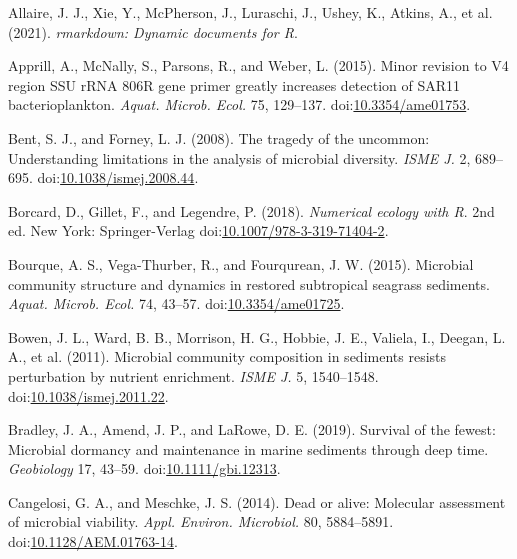 \documentclass[12pt,]{article}
\begin{document}
 \setlength{\emergencystretch}{8.5em}

\hypertarget{refs}{}
\leavevmode\hypertarget{ref-Allaire2021}{}%
Allaire, J. J., Xie, Y., McPherson, J., Luraschi, J., Ushey, K., Atkins,
A., et al. (2021). \emph{rmarkdown: Dynamic documents for R}.

\leavevmode\hypertarget{ref-Apprill2015a}{}%
Apprill, A., McNally, S., Parsons, R., and Weber, L. (2015). Minor
revision to V4 region SSU rRNA 806R gene primer greatly increases
detection of SAR11 bacterioplankton. \emph{Aquat. Microb. Ecol.} 75,
129--137. doi:\href{https://doi.org/10.3354/ame01753}{10.3354/ame01753}.

\leavevmode\hypertarget{ref-Bent2008}{}%
Bent, S. J., and Forney, L. J. (2008). The tragedy of the uncommon:
Understanding limitations in the analysis of microbial diversity.
\emph{ISME J.} 2, 689--695.
doi:\href{https://doi.org/10.1038/ismej.2008.44}{10.1038/ismej.2008.44}.

\leavevmode\hypertarget{ref-Borcard2018}{}%
Borcard, D., Gillet, F., and Legendre, P. (2018). \emph{Numerical
ecology with R}. 2nd ed. New York: Springer-Verlag
doi:\href{https://doi.org/10.1007/978-3-319-71404-2}{10.1007/978-3-319-71404-2}.

\leavevmode\hypertarget{ref-Bourque2015}{}%
Bourque, A. S., Vega-Thurber, R., and Fourqurean, J. W. (2015).
Microbial community structure and dynamics in restored subtropical
seagrass sediments. \emph{Aquat. Microb. Ecol.} 74, 43--57.
doi:\href{https://doi.org/10.3354/ame01725}{10.3354/ame01725}.

\leavevmode\hypertarget{ref-Bowen2011a}{}%
Bowen, J. L., Ward, B. B., Morrison, H. G., Hobbie, J. E., Valiela, I.,
Deegan, L. A., et al. (2011). Microbial community composition in
sediments resists perturbation by nutrient enrichment. \emph{ISME J.} 5,
1540--1548.
doi:\href{https://doi.org/10.1038/ismej.2011.22}{10.1038/ismej.2011.22}.

\leavevmode\hypertarget{ref-Bradley2019}{}%
Bradley, J. A., Amend, J. P., and LaRowe, D. E. (2019). Survival of the
fewest: Microbial dormancy and maintenance in marine sediments through
deep time. \emph{Geobiology} 17, 43--59.
doi:\href{https://doi.org/10.1111/gbi.12313}{10.1111/gbi.12313}.

\leavevmode\hypertarget{ref-Cangelosi2014}{}%
Cangelosi, G. A., and Meschke, J. S. (2014). Dead or alive: Molecular
assessment of microbial viability. \emph{Appl. Environ. Microbiol.} 80,
5884--5891.
doi:\href{https://doi.org/10.1128/AEM.01763-14}{10.1128/AEM.01763-14}.
\end{document}
